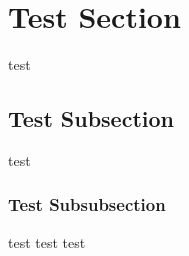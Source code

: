 \section{Test Section}
test
\subsection{Test Subsection}
test
\subsubsection{Test Subsubsection}
test
test
test
